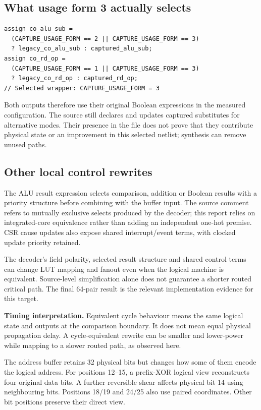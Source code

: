 \subsection{What usage form 3 actually selects}
\begin{lstlisting}[language=VerilogDiff,basicstyle=\ttfamily\scriptsize,breaklines=true]
assign co_alu_sub =
  (CAPTURE_USAGE_FORM == 2 || CAPTURE_USAGE_FORM == 3)
  ? legacy_co_alu_sub : captured_alu_sub;
assign co_rd_op =
  (CAPTURE_USAGE_FORM == 1 || CAPTURE_USAGE_FORM == 3)
  ? legacy_co_rd_op : captured_rd_op;
// Selected wrapper: CAPTURE_USAGE_FORM = 3
\end{lstlisting}
Both outputs therefore use their original Boolean expressions in the measured configuration. The source still declares and updates captured substitutes for alternative modes. Their presence in the file does not prove that they contribute physical state or an improvement in this selected netlist; synthesis can remove unused paths.

\subsection{Other local control rewrites}
The ALU result expression selects comparison, addition or Boolean results with a priority structure before combining with the buffer input. The source comment refers to mutually exclusive selects produced by the decoder; this report relies on integrated-core equivalence rather than adding an independent one-hot premise. CSR cause updates also expose shared interrupt/event terms, with clocked update priority retained.

The decoder's field polarity, selected result structure and shared control terms can change LUT mapping and fanout even when the logical machine is equivalent. Source-level simplification alone does not guarantee a shorter routed critical path. The final 64-pair result is the relevant implementation evidence for this target.

\begin{scopebox}\textbf{Timing interpretation.} Equivalent cycle behaviour means the same logical state and outputs at the comparison boundary. It does not mean equal physical propagation delay. A cycle-equivalent rewrite can be smaller and lower-power while mapping to a slower routed path, as observed here.\end{scopebox}

The address buffer retains 32 physical bits but changes how some of them encode the logical address. For positions 12--15, a prefix-XOR logical view reconstructs four original data bits. A further reversible shear affects physical bit 14 using neighbouring bits. Positions 18/19 and 24/25 also use paired coordinates. Other bit positions preserve their direct view.

